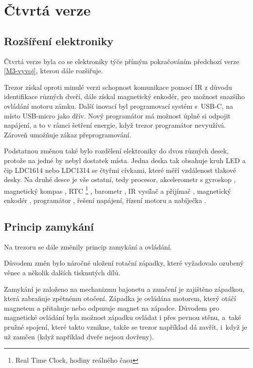 \section{Čtvrtá verze}
\label{E4-vivoj}

\subsection{Rozšíření elektroniky}

Čtvrtá verze byla co se elektroniky týče přímým pokračováním předchozí verze \ref{M3-vyvoj}, kterou dále rozšiřuje.

Trezor získal oproti minulé verzi schopnost komunikace pomocí IR z důvodu identifikace růz\-ných dveří, dále získal magnetický enkodér, pro možnost snaz\-ší\-ho ovládání
motoru zámku. 
Další inovací byl programovací systém s~USB-C, na místo USB-micro jako dřív. Nový programátor má možnost úplně si odpojit napáje\-ní, a to v rámci šetření 
energie, když trezor programátor nevyužívá. 
Zároveň umožňuje zákaz přeprogramování.

Podstatnou změnou také bylo rozdělení elektroniky do dvou různých desek, protože na jedné by nebyl dostatek místa. Jedna deska  
tak obsahuje kruh LED \parencite{WS2812} a čip LDC1614 \parencite{LDC1614} nebo LDC1314 se čtyřmi cívkami, které měří vzdálenost tlakové desky. Na druhé desce
je vše ostatní, tedy procesor\parencite{ESP32}, akcelerometr s
gyroskop \parencite{bmx055} \parencite{mpu6050}, magnetický kompas \parencite{bmx055} \parencite{qmc5883}, RTC \footnote{Real Time Clock, hodiny reálného času} \parencite{m41t62}, 
barometr \parencite{spl06}, IR vysílač \parencite{ir19-21c/tr8} a přijímač \parencite{irm-h936}, magnetický enkodér \parencite{mh253} \parencite{ss360nt}, programátor \parencite{cp2102},
řešení napájení, řízení motoru a nabíječka \parencite{se9017}. 

\subsection{Princip zamykání}

Na trezoru se dále změnily princip zamykání a ovládání. 

Důvodem změn bylo náročné uložení rotační západky, 
které vyžadovalo ozubený věnec a několik dalších tisknutých dílů.

Zamykání je založeno na mechanizmu bajonetu a zamčení je zajištěno západ\-kou, která zabraňuje zpětnému otočení.
Západka je ovládána motorem, který otáčí magnetem a přitahuje nebo odpuzuje magnet na západce. Důvodem pro magnetické ovládání
byla možnost západku ovládat i přes pevnou stěnu, a~také pružné spojení, které takto vznikne, takže se trezor například dá zavřít, i~když
je už zamčen (když například dveře nejsou dovřeny).

